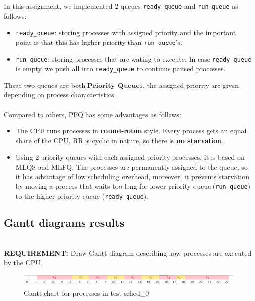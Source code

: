 \documentclass[a4paper]{article}
\begin{document}
    In this assignment, we implemented 2 queues \texttt{ready\_queue} and
    \texttt{run\_queue} as follows: \\
    \begin{itemize}
    \item \texttt{ready\_queue}: storing processes with assigned priority and the important point is that this has higher priority than \texttt{run\_queue}'s. \\
    \item \texttt{run\_queue}: storing processes that are wating to execute. In case \texttt{ready\_queue} is empty, we push all into \texttt{ready\_queue} to continue paused processes. \\
    \end{itemize}
    These two queues are both \textbf{Priority Queues}, the assigned priority are given depending on process characteristics. \\
    \\
    Compared to others, PFQ has some advantages as follows: \\
    \begin{itemize}
        \item The CPU runs processes in \textbf{round-robin} style. Every process gets an equal share of the CPU. RR is cyclic in nature, so there is \textbf{no starvation}.
        \item Using 2 priority queues with each assigned priority processes, it is based on MLQS and MLFQ. The processes are permanently assigned to the queue, so it has advantage of low scheduling overhead, moreover, it prevents starvation by moving a process that waits too long for lower priority queue (\texttt{run\_queue}) to the higher priority queue (\texttt{ready\_queue}). 
    \end{itemize}
	\subsection{Gantt diagrams results}
	\hfill \\
	{\bfseries REQUIREMENT: }Draw Gantt diagram describing how processes are executed by the CPU.\\
	\begin{figure}[h]
	    \centering
	    \includegraphics[width=\textwidth]{TEST0.PNG}
	    \caption{Gantt chart for processes in test sched\_0}
	    \label{fig:my_label}
	\end{figure}
	
\end{document}
